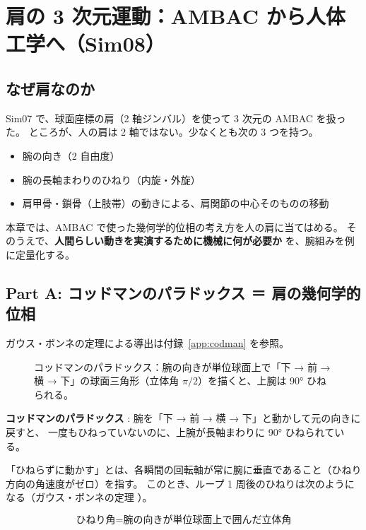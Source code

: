 \chapter{肩の 3 次元運動：AMBAC から人体工学へ（Sim08）}\label{ch:shoulder}

\section{なぜ肩なのか}

Sim07 で、球面座標の肩（2 軸ジンバル）を使って 3 次元の AMBAC を扱った。 ところが、人の肩は 2 軸ではない。少なくとも次の 3 つを持つ。

\begin{itemize}
\tightlist
\item
  腕の向き（2 自由度）
\item
  腕の長軸まわりのひねり（内旋・外旋）
\item
  肩甲骨・鎖骨（上肢帯）の動きによる、肩関節の中心そのものの移動
\end{itemize}

本章では、AMBAC で使った幾何学的位相の考え方を人の肩に当てはめる。 そのうえで、\textbf{人間らしい動きを実演するために機械に何が必要か} を、腕組みを例に定量化する。

\section{Part A: コッドマンのパラドックス ＝ 肩の幾何学的位相}

ガウス・ボンネの定理による導出は付録~\ref{app:codman} を参照。

\begin{figure}[htbp]\centering
\resizebox{0.7\linewidth}{!}{}
\caption{コッドマンのパラドックス：腕の向きが単位球面上で「下 → 前 → 横 → 下」の球面三角形（立体角 $\pi/2$）を描くと、上腕は 90° ひねられる。}\label{fig:tikz-codman}
\end{figure}


\textbf{コッドマンのパラドックス} \cite{R34,R35}: 腕を「下 → 前 → 横 → 下」と動かして元の向きに戻すと、 一度もひねっていないのに、上腕が長軸まわりに 90° ひねられている。

「ひねらずに動かす」とは、各瞬間の回転軸が常に腕に垂直であること（ひねり方向の角速度がゼロ）を指す。 このとき、ループ 1 周後のひねりは次のようになる（ガウス・ボンネの定理 \cite{R11}）。

\[
\text{ひねり角} = \text{腕の向きが単位球面上で囲んだ立体角}
\]

